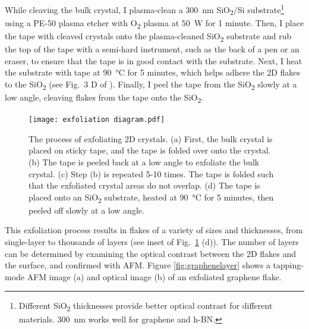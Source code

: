 \documentclass[double,12pt,1in,seploa]{beavtex}
\begin{document}
While cleaving the bulk crystal, I plasma-clean a \SI{300}{\nano\meter} SiO\textsubscript{2}/Si substrate\footnote{Different SiO\textsubscript{2} thicknesses provide better optical contrast for different materials. \SI{300}{\nano\meter} works well for graphene and h-BN.} using a PE-50 plasma etcher with O\textsubscript{2} plasma at \SI{50}{\watt} for 1 minute. Then, I place the tape with cleaved crystals onto the plasma-cleaned SiO\textsubscript{2} substrate and rub the top of the tape with a semi-hard instrument, such as the back of a pen or an eraser, to ensure that the tape is in good contact with the substrate. Next, I heat the substrate with tape at \SI{90}{\celsius} for 5 minutes, which helps adhere the 2D flakes to the SiO\textsubscript{2} (see Fig.\ 3 D of \cite{islam_exfoliation_2022}). Finally, I peel the tape from the SiO\textsubscript{2} slowly at a low angle, cleaving flakes from the tape onto the SiO\textsubscript{2}. 


\begin{figure}
    \texttt{[image: exfoliation diagram.pdf]}
    \caption{The process of exfoliating 2D crystals. (a) First, the bulk crystal is placed on sticky tape, and the tape is folded over onto the crystal. (b) The tape is peeled back at a low angle to exfoliate the bulk crystal. (c) Step (b) is repeated 5-10 times. The tape is folded such that the exfoliated crystal areas do not overlap. (d) The tape is placed onto an SiO\textsubscript{2} substrate, heated at \SI{90}{\celsius} for 5 minutes, then peeled off slowly at a low angle.}
    \label{exfoliation diagram}
\end{figure}
This exfoliation process results in flakes of a variety of sizes and thicknesses, from single-layer to thousands of layers (see inset of Fig.\ \ref{exfoliation diagram} (d)). The number of layers can be determined by examining the optical contrast between the 2D flakes and the surface, and confirmed with AFM. Figure \ref{fig:graphenelayer} shows a tapping-mode AFM image (a) and optical image (b) of an exfoliated graphene flake.
\end{document}
